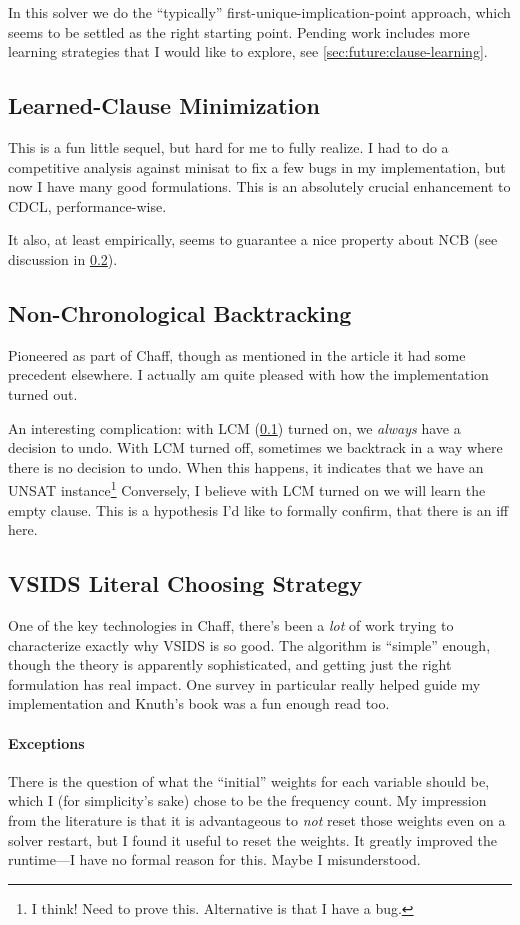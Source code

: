 \documentclass{article}
\begin{document}
In this solver we do the ``typically'' first-unique-implication-point approach, which seems to be settled as the right starting point.
Pending work includes more learning strategies that I would like to explore, see \cref{sec:future:clause-learning}.
\subsection{Learned-Clause Minimization}\label{sec:LCM}
This is a fun little sequel, but hard for me to fully realize.\cite{sorenssonbiere2009}
I had to do a competitive analysis against minisat to fix a few bugs in my implementation, but now I have many good formulations.
This is an absolutely crucial enhancement to CDCL, performance-wise.

It also, at least empirically, seems to guarantee a nice property about NCB (see discussion in \cref{sec:NCB}).
\subsection{Non-Chronological Backtracking}\label{sec:NCB}
Pioneered as part of Chaff\cite{marques-silvasakallah1999}, though as mentioned in the article it had some precedent elsewhere.
I actually am quite pleased with how the implementation turned out.

An interesting complication: with LCM (\cref{sec:LCM}) turned on, we \emph{always} have a decision to undo.
With LCM turned off, sometimes we backtrack in a way where there is no decision to undo.
When this happens, it indicates that we have an UNSAT instance\footnote{I think! Need to prove this. Alternative is that I have a bug.}
Conversely, I believe with LCM turned on we will learn the empty clause.
This is a hypothesis I'd like to formally confirm, that there is an iff here.

\subsection{VSIDS Literal Choosing Strategy}\label{sec:VSIDS}
One of the key technologies in Chaff\cite{chaff}, there's been a \emph{lot} of work trying to characterize exactly why VSIDS is so good.
The algorithm is ``simple'' enough, though the theory is apparently sophisticated, and getting just the right formulation has real impact.
One survey in particular really helped guide my implementation\cite{bierefrohlich2015} and Knuth's book was a fun enough read too\cite{knuth2015}.
\paragraph{Exceptions}
There is the question of what the ``initial'' weights for each variable should be, which I (for simplicity's sake) chose to be the frequency count.
My impression from the literature is that it is advantageous to \emph{not} reset those weights even on a solver restart, but I found it useful to reset the weights.
It greatly improved the runtime---I have no formal reason for this.
Maybe I misunderstood.
\end{document}

